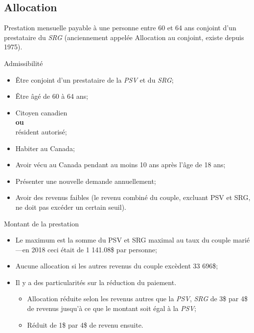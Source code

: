 \documentclass[10pt, french]{article}
\begin{document}
\begin{multicols*}{3}
\subsection{Allocation}
\label{sec:Alloc}
\begin{definitionNOHFILL}[Définition]
Prestation mensuelle payable à une personne entre 60 et 64 ans conjoint d'un prestataire du \textit{SRG} (anciennement appelée Allocation au conjoint, existe depuis 1975).
\end{definitionNOHFILL}

\begin{conceptgen}{Admissibilité}
\begin{itemize}[leftmargin = *]
	\item	Être conjoint d'un prestataire de la \textit{PSV} et du \textit{SRG};
	\item	Être âgé de 60 à 64 ans;
	\item	Citoyen canadien \\
			\textbf{ou}\\
			résident autorisé;
	\item	Habiter au Canada;
	\item	Avoir vécu au Canada pendant au moins 10 ans après l'âge de 18 ans;
	\item	Présenter une nouvelle demande annuellement;
	\item	Avoir des revenus faibles (le revenu combiné du couple, excluant PSV et SRG, ne doit pas excéder un certain seuil).
\end{itemize}
\end{conceptgen}

\begin{conceptgen}{Montant de la prestation}

\begin{itemize}[leftmargin = *]
	\item	Le maximum est la somme du PSV et SRG maximal au taux du couple marié---en 2018 ceci était de 1 141.08\$ par personne;
	\item	Aucune allocation si les autres revenus du couple excèdent 33 696\$;
	\item	Il y a des particularités sur la réduction du paiement.
			\begin{itemize}[leftmargin = *]
			\item   Allocation réduite selon les revenus autres que la \textit{PSV}, \textit{SRG} de 3\$ par 4\$ de revenus jusqu'à ce que le montant soit égal à la \textit{PSV};
			\item   Réduit de 1\$ par 4\$ de revenu ensuite. 
			\end{itemize}
\end{itemize}
\end{conceptgen}


\end{multicols*}
\end{document}
